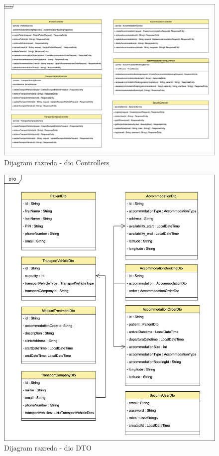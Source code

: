 						
			\begin{figure}[H]
				\includegraphics[scale=0.07]{slike/arhitektura_controller_class_diagram_v2.png} %
				\centering
				\caption{Dijagram razreda - dio Controllers}
				\label{fig:arhitektura_controller_class_diagram}
			\end{figure}
			
			\begin{figure}[H]
				\includegraphics[scale=0.12]{slike/arhitektura_dto_class_diagram_v2.png} %
				\centering
				\caption{Dijagram razreda - dio DTO}
				\label{fig:arhitektura_dto_class_diagram}
			\end{figure}
			
